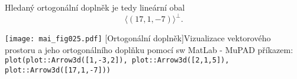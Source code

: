 \begin{mdframed}[style=mdexam]
\begin{example}
    Hledaný ortogonální doplněk je tedy lineární obal $$\langle(17, 1, -7)\rangle^\bot.$$
    
      {\centering
      \captionsetup{type=figure}
      \texttt{[image: mai\_fig025.pdf]}
      [Ortogonální doplněk]{Vizualizace vektorového prostoru a jeho ortogonálního
              doplňku pomocí sw MatLab - MuPAD příkazem: \texttt{plot(plot::Arrow3d([1,-3,2]),
              plot::Arrow3d([2,1,5]), plot::Arrow3d([17,1,-7]))}}
      \label{LA:fig_ort01}
      \par}
  \end{example}
\end{mdframed}
